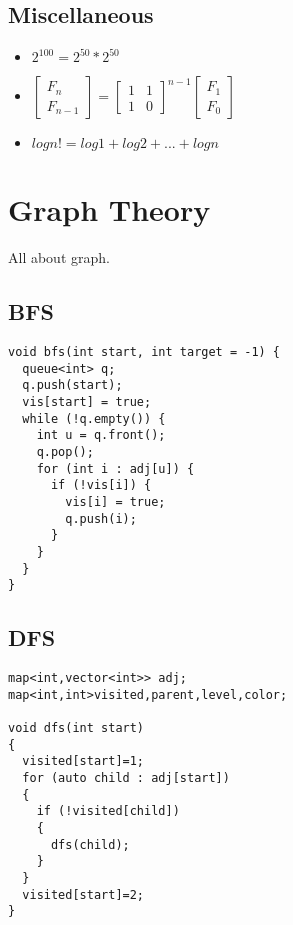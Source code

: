 \documentclass[10pt, a4paper]{article}
\begin{document}
\begin{multicols}{2}
\subsection{Miscellaneous}
\begin{itemize}
	\item \(2^{100} = 2^{50} * 2^{50}\)
	\item \( 
        \begin{bmatrix}
            F_n\\
            F_{n-1}
        \end{bmatrix} = 
        \begin{bmatrix}
            1 & 1\\
            1 & 0
        \end{bmatrix} ^ {n-1}
        \begin{bmatrix}
            F_1\\
            F_0
        \end{bmatrix}
    \)
    \item \(
        logn! = log1 +log2+...+logn
    \)
\end{itemize}

\section{Graph Theory}
All about graph.
\subsection{BFS}
\begin{lstlisting} 
void bfs(int start, int target = -1) {
  queue<int> q;
  q.push(start);
  vis[start] = true;
  while (!q.empty()) {
    int u = q.front();
    q.pop();
    for (int i : adj[u]) {
      if (!vis[i]) {
        vis[i] = true;
        q.push(i);
      }
    }
  }
}
\end{lstlisting}
\subsection{DFS}
\begin{lstlisting}
map<int,vector<int>> adj;
map<int,int>visited,parent,level,color;

void dfs(int start)
{
  visited[start]=1;
  for (auto child : adj[start])
  {
    if (!visited[child])
    {
      dfs(child);
    }
  }
  visited[start]=2;
}
\end{lstlisting}

\end{multicols}
\end{document}
